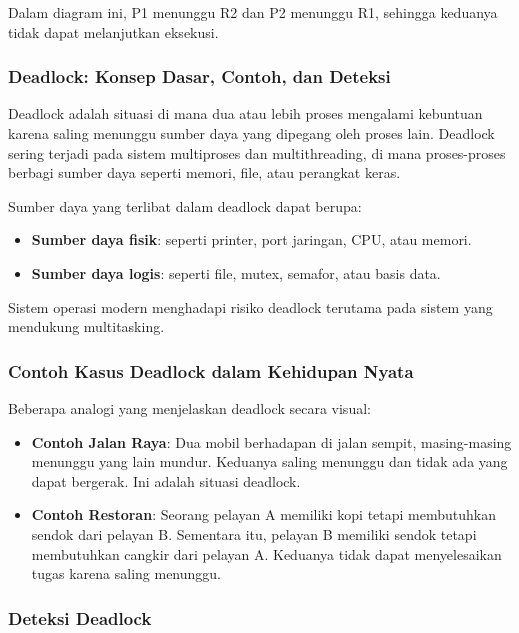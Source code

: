 \documentclass[12pt]{article}
\begin{document}
Dalam diagram ini, P1 menunggu R2 dan P2 menunggu R1, sehingga keduanya tidak dapat melanjutkan eksekusi.

\subsubsection{Deadlock: Konsep Dasar, Contoh, dan Deteksi}

Deadlock adalah situasi di mana dua atau lebih proses mengalami kebuntuan karena saling menunggu sumber daya yang dipegang oleh proses lain. Deadlock sering terjadi pada sistem multiproses dan multithreading, di mana proses-proses berbagi sumber daya seperti memori, file, atau perangkat keras.

Sumber daya yang terlibat dalam deadlock dapat berupa:

\begin{itemize}
    \item \textbf{Sumber daya fisik}: seperti printer, port jaringan, CPU, atau memori.
    \item \textbf{Sumber daya logis}: seperti file, mutex, semafor, atau basis data.
\end{itemize}

Sistem operasi modern menghadapi risiko deadlock terutama pada sistem yang mendukung multitasking.

\subsubsection{Contoh Kasus Deadlock dalam Kehidupan Nyata}

Beberapa analogi yang menjelaskan deadlock secara visual:

\begin{itemize}
    \item \textbf{Contoh Jalan Raya}: Dua mobil berhadapan di jalan sempit, masing-masing menunggu yang lain mundur. Keduanya saling menunggu dan tidak ada yang dapat bergerak. Ini adalah situasi deadlock.
    \item \textbf{Contoh Restoran}: Seorang pelayan A memiliki kopi tetapi membutuhkan sendok dari pelayan B. Sementara itu, pelayan B memiliki sendok tetapi membutuhkan cangkir dari pelayan A. Keduanya tidak dapat menyelesaikan tugas karena saling menunggu.
\end{itemize}

\subsubsection{Deteksi Deadlock}
\end{document}

